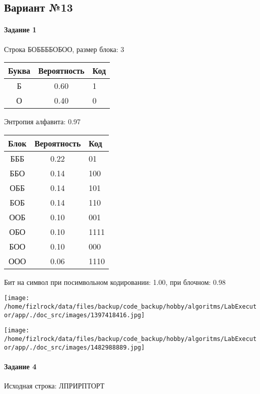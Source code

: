 \documentclass[a4paper, 12pt]{article}
\begin{document}
\subsection{Вариант №13}
\paragraph{Задание 1}

Строка БОББББОБОО, размер блока: 3
\begin{center}
 \begin{tabular}{ |c|c|l| } 
  \hline
     Буква & Вероятность & Код\\ \hline
Б & 0.60 & 1\\\hline
О & 0.40 & 0
\\ \hline \end{tabular}
\end{center}
Энтропия алфавита: 0.97
\begin{center}
 \begin{tabular}{ |c|c|l| } 
  \hline
     Блок & Вероятность & Код\\ \hline
БББ & 0.22 & 01\\\hline
ББО & 0.14 & 100\\\hline
ОББ & 0.14 & 101\\\hline
БОБ & 0.14 & 110\\\hline
ООБ & 0.10 & 001\\\hline
ОБО & 0.10 & 1111\\\hline
БОО & 0.10 & 000\\\hline
ООО & 0.06 & 1110
\\ \hline \end{tabular}
\end{center}
Бит на символ при посимвольном кодировании: 1.00, при блочном: 0.98

\texttt{[image: /home/fizlrock/data/files/backup/code\_backup/hobby/algoritms/LabExecutor/app/./doc\_src/images/1397418416.jpg]}

\texttt{[image: /home/fizlrock/data/files/backup/code\_backup/hobby/algoritms/LabExecutor/app/./doc\_src/images/1482988889.jpg]}
\paragraph{Задание 4}


Исходная строка: ЛПРИРПТОРТ
\end{document}
